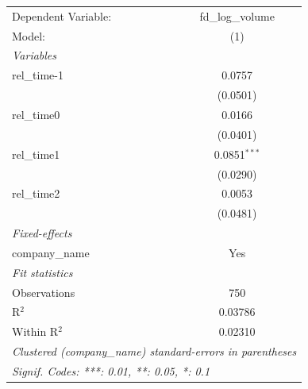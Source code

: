 
\begingroup
\centering
\begin{tabular}{lc}
   \tabularnewline \midrule \midrule
   Dependent Variable: & fd\_log\_volume\\    
   Model:              & (1)\\  
   \midrule
   \emph{Variables}\\
   rel\_time-1         & 0.0757\\   
                       & (0.0501)\\   
   rel\_time0          & 0.0166\\   
                       & (0.0401)\\   
   rel\_time1          & 0.0851$^{***}$\\   
                       & (0.0290)\\   
   rel\_time2          & 0.0053\\   
                       & (0.0481)\\   
   \midrule
   \emph{Fixed-effects}\\
   company\_name       & Yes\\  
   \midrule
   \emph{Fit statistics}\\
   Observations        & 750\\  
   R$^2$               & 0.03786\\  
   Within R$^2$        & 0.02310\\  
   \midrule \midrule
   \multicolumn{2}{l}{\emph{Clustered (company\_name) standard-errors in parentheses}}\\
   \multicolumn{2}{l}{\emph{Signif. Codes: ***: 0.01, **: 0.05, *: 0.1}}\\
\end{tabular}
\par\endgroup


